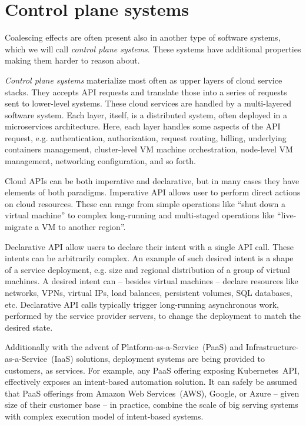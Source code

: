 \section{Control plane systems}

Coalescing effects are often present also in another type of software systems, which we will call \textit{control plane systems}. These systems have additional properties making them harder to reason about.

\textit{Control plane systems} materialize most often as upper layers of cloud service stacks. They accepts API requests and translate those into a series of requests sent to lower-level systems. These cloud services are handled by a multi-layered software system. Each layer, itself, is a distributed system, often deployed in a microservices architecture. Here, each layer handles some aspects of the API request, e.g. authentication, authorization, request routing, billing, underlying containers management, cluster-level VM machine orchestration, node-level VM management, networking configuration, and so forth.

Cloud APIs can be both imperative and declarative, but in many cases they have elements of both paradigms. Imperative API allows user to perform direct actions on cloud resources. These can range from simple operations like ``shut down a virtual machine'' to complex long-running and multi-staged operations like ``live-migrate a VM to another region''.

Declarative API allow users to declare their intent with a single API call. These intents can be arbitrarily complex. An example of such desired intent is a shape of a service deployment, e.g. size and regional distribution of a group of virtual machines. A desired intent can -- besides virtual machines -- declare resources like networks, VPNs, virtual IPs, load balances, persistent volumes, SQL databases, etc. Declarative API calls typically trigger long-running asynchronous work, performed by the service provider servers, to change the deployment to match the desired state.

Additionally with the advent of Platform\hyp{}as-a\hyp{}Service~(PaaS) and Infrastructure\hyp{}as-a\hyp{}Service~(IaaS) solutions, deployment systems are being provided to customers, as services. For example, any PaaS offering exposing Kubernetes~API, effectively exposes an intent-based automation solution. It can safely be assumed that PaaS offerings from Amazon Web Services~(AWS), Google, or Azure -- given size of their customer base -- in practice, combine the scale of big serving systems with complex execution model of intent-based systems.

